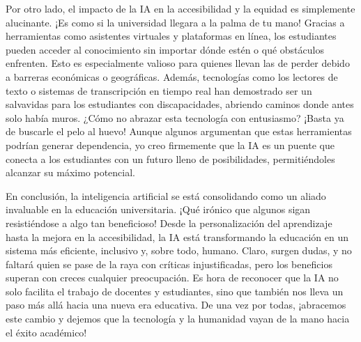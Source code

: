\documentclass{article}
\begin{document}
Por otro lado, el impacto de la IA en la accesibilidad y la equidad es simplemente alucinante. ¡Es como si la universidad llegara a la palma de tu mano! Gracias a herramientas como asistentes virtuales y plataformas en línea, los estudiantes pueden acceder al conocimiento sin importar dónde estén o qué obstáculos enfrenten. Esto es especialmente valioso para quienes llevan las de perder debido a barreras económicas o geográficas. Además, tecnologías como los lectores de texto o sistemas de transcripción en tiempo real han demostrado ser un salvavidas para los estudiantes con discapacidades, abriendo caminos donde antes solo había muros. ¿Cómo no abrazar esta tecnología con entusiasmo? ¡Basta ya de buscarle el pelo al huevo! Aunque algunos argumentan que estas herramientas podrían generar dependencia, yo creo firmemente que la IA es un puente que conecta a los estudiantes con un futuro lleno de posibilidades, permitiéndoles alcanzar su máximo potencial.

En conclusión, la inteligencia artificial se está consolidando como un aliado invaluable en la educación universitaria. ¡Qué irónico que algunos sigan resistiéndose a algo tan beneficioso! Desde la personalización del aprendizaje hasta la mejora en la accesibilidad, la IA está transformando la educación en un sistema más eficiente, inclusivo y, sobre todo, humano. Claro, surgen dudas, y no faltará quien se pase de la raya con críticas injustificadas, pero los beneficios superan con creces cualquier preocupación. Es hora de reconocer que la IA no solo facilita el trabajo de docentes y estudiantes, sino que también nos lleva un paso más allá hacia una nueva era educativa. De una vez por todas, ¡abracemos este cambio y dejemos que la tecnología y la humanidad vayan de la mano hacia el éxito académico!
\end{document}
